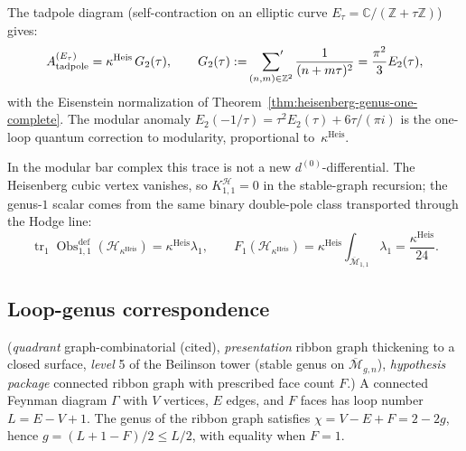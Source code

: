 The tadpole diagram (self-contraction on an elliptic curve
$E_\tau = \mathbb{C}/(\mathbb{Z} + \tau\mathbb{Z})$) gives:
\begin{equation}
A_{\text{tadpole}}^{(E_\tau)}
= \kappa^{\mathrm{Heis}}\,G_2(\tau),\qquad
G_2(\tau):=\sideset{}{'}\sum_{(n,m) \in \mathbb{Z}^2}
\frac{1}{(n + m\tau)^2}
= \frac{\pi^2}{3}E_2(\tau),
\end{equation}
with the Eisenstein normalization of
Theorem~\ref{thm:heisenberg-genus-one-complete}.  The modular anomaly
$E_2(-1/\tau) = \tau^2 E_2(\tau) + 6\tau/(\pi i)$
is the one-loop quantum correction to modularity, proportional
to~$\kappa^{\mathrm{Heis}}$.

\begin{center}
\end{center}

In the modular bar complex this trace is not a new
$d^{(0)}$-differential.  The Heisenberg cubic vertex vanishes, so
$K_{1,1}^{\mathcal{H}}=0$ in the stable-graph recursion; the
genus-$1$ scalar comes from the same binary double-pole class
transported through the Hodge line:
\[
\operatorname{tr}_1\operatorname{Obs}^{\mathrm{def}}_{1,1}
(\mathcal{H}_{\kappa^{\mathrm{Heis}}})
= \kappa^{\mathrm{Heis}}\lambda_1,\qquad
F_1(\mathcal{H}_{\kappa^{\mathrm{Heis}}})
= \kappa^{\mathrm{Heis}}\!\int_{\overline{\mathcal{M}}_{1,1}}\lambda_1
= \frac{\kappa^{\mathrm{Heis}}}{24}.
\]

\subsection{Loop-genus correspondence}

\begin{theorem}
\label{thm:loop-genus-correspondence}
\textup{(}\emph{quadrant} graph-combinatorial \textup{(}cited\textup{)},
\emph{presentation} ribbon graph thickening to a closed surface,
\emph{level} 5 of the Beilinson tower \textup{(}stable genus on
$\overline{\mathcal{M}}_{g,n}$\textup{)}, \emph{hypothesis package}
connected ribbon graph with prescribed face count
$F$.\textup{)}
A connected Feynman diagram $\Gamma$ with $V$ vertices, $E$ edges,
and $F$ faces has loop number $L = E - V + 1$. The genus of the
ribbon graph satisfies
$\chi = V - E + F = 2 - 2g$, hence $g = (L + 1 - F)/2 \leq L/2$,
with equality when $F = 1$.
\end{theorem}

